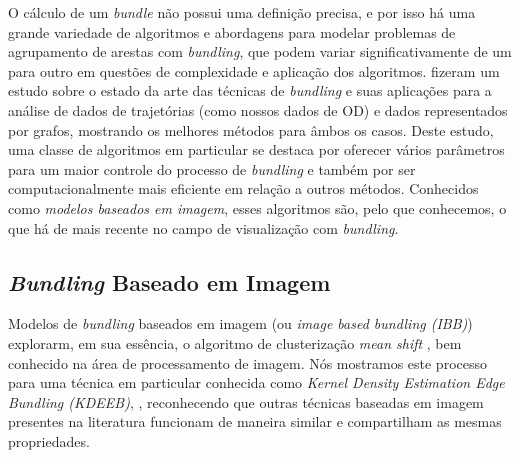 O cálculo de um \emph{bundle} não possui uma definição precisa, e por isso há
uma grande variedade de algoritmos e abordagens para modelar problemas de
agrupamento de arestas com \emph{bundling}, que podem variar significativamente
de um para outro em questões de complexidade e aplicação dos algoritmos.
\cite{Lhuillier2017} fizeram um estudo sobre o estado da arte das técnicas de
\emph{bundling} e suas aplicações para a análise de dados de trajetórias (como
nossos dados de OD) e dados representados por grafos, mostrando os melhores
métodos para âmbos os casos. Deste estudo, uma classe de algoritmos em particular
se destaca por oferecer vários parâmetros para um maior controle do processo de \emph{bundling}
e também por ser computacionalmente mais eficiente em relação a outros métodos. Conhecidos
como \emph{modelos baseados em imagem}, esses algoritmos são, pelo que conhecemos,
o que há de mais recente no campo de visualização com \emph{bundling}.

\subsection{\emph{Bundling} Baseado em Imagem}
\label{sec:modelo-imagem}

Modelos de \emph{bundling} baseados em imagem (ou \emph{image based bundling
(IBB)}) explorarm, em sua essência, o algoritmo de clusterização \emph{mean
shift} \citep{comaniciu02}, bem conhecido na área de processamento de imagem.
Nós mostramos este processo para uma técnica em particular conhecida como
\emph{Kernel Density Estimation Edge Bundling (KDEEB)}, \citep{hurter:12},
reconhecendo que outras técnicas baseadas em imagem presentes na literatura
funcionam de maneira similar e compartilham as mesmas propriedades.

